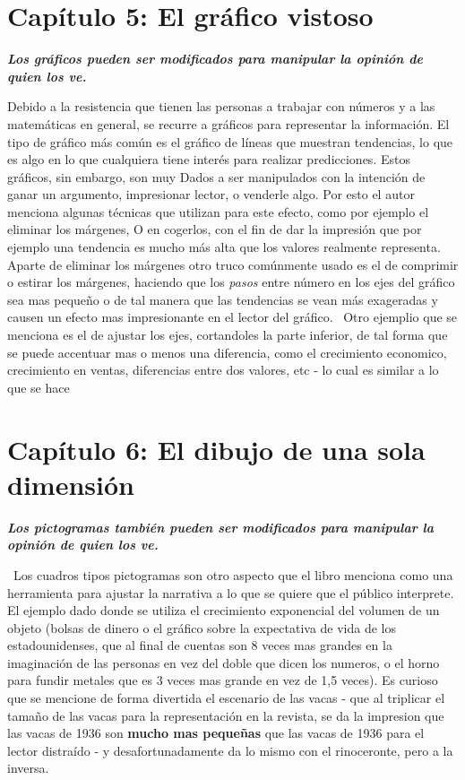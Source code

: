 \documentclass[letterpaper, 11pt]{article}
\begin{document}
\section*{Capítulo 5: El gráfico vistoso}

\textbf{\textit{Los gráficos pueden ser modificados para manipular la opinión de quien los ve.}}

Debido a la resistencia que tienen las personas a trabajar con números y a las matemáticas en general, se recurre a gráficos para representar la información. El tipo de gráfico más común es el gráfico de líneas que muestran tendencias, lo que es algo en lo que cualquiera tiene interés para realizar predicciones. Estos gráficos, sin embargo, son muy Dados a ser manipulados con la intención de ganar un argumento, impresionar lector, o venderle algo. Por esto el autor menciona algunas técnicas que utilizan para este efecto, como por ejemplo el eliminar los márgenes, O en cogerlos, con el fin de dar la impresión que por ejemplo una tendencia es mucho más alta que los valores realmente representa. Aparte de eliminar los márgenes otro truco comúnmente usado es el de comprimir o estirar los márgenes, haciendo que los \textit{pasos} entre número en los ejes del gráfico sea mas pequeño o  de tal manera que las tendencias se vean más exageradas y causen un efecto mas impresionante en el lector del gráfico.
 Otro ejemplio que se menciona es el de ajustar los ejes, cortandoles la parte inferior, de tal forma que se puede accentuar mas o menos una diferencia, como el crecimiento economico, crecimiento en ventas, diferencias entre dos valores, etc - lo cual es similar a lo que se hace 

\section*{Capítulo 6: El dibujo de una sola dimensión}

\textbf{\textit{Los pictogramas también pueden ser modificados para manipular la opinión de quien los ve.}}

 Los cuadros tipos pictogramas son otro aspecto que el libro menciona como una herramienta para ajustar la narrativa a lo que se quiere que el público interprete. El ejemplo dado donde se utiliza el crecimiento exponencial del volumen de un objeto (bolsas de dinero o el gráfico sobre la expectativa de vida de los estadounidenses, que al final de cuentas son 8 veces mas grandes en la imaginación de las personas en vez del doble que dicen los numeros, o el horno para fundir metales que es 3 veces mas grande en vez de 1,5 veces). Es curioso que se mencione de forma divertida el escenario de las vacas - que al triplicar el tamaño de las vacas para la representación en la revista, se da la impresion que las vacas de 1936 son \textbf{mucho mas pequeñas} que las vacas de 1936 para el lector distraído - y desafortunadamente da lo mismo con el rinoceronte, pero a la inversa.
\end{document}
